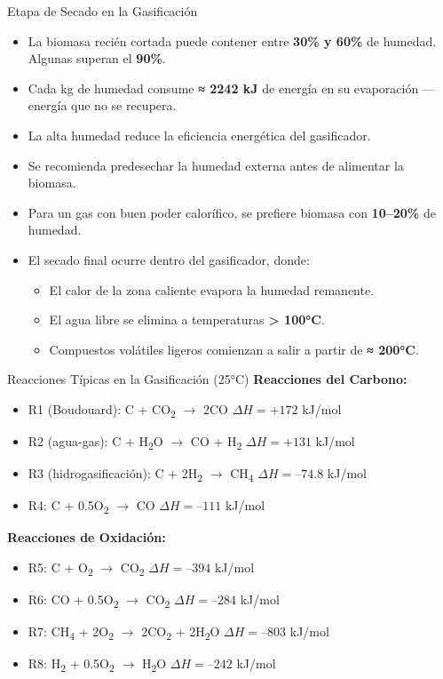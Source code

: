 \documentclass[../../main.tex]{subfiles}
\begin{document}
\begin{frame}{Etapa de Secado en la Gasificación}
\small
\begin{itemize}
  \item La biomasa recién cortada puede contener entre \textbf{30\% y 60\%} de humedad. Algunas superan el \textbf{90\%}.
  \item Cada kg de humedad consume \textbf{≈ 2242 kJ} de energía en su evaporación — energía que no se recupera.
  \item La alta humedad reduce la eficiencia energética del gasificador.
  \item Se recomienda predesechar la humedad externa antes de alimentar la biomasa.
  \item Para un gas con buen poder calorífico, se prefiere biomasa con \textbf{10–20\%} de humedad.
  \item El secado final ocurre dentro del gasificador, donde:
  \begin{itemize}
    \item El calor de la zona caliente evapora la humedad remanente.
    \item El agua libre se elimina a temperaturas \textbf{> 100°C}.
    \item Compuestos volátiles ligeros comienzan a salir a partir de \textbf{≈ 200°C}.
  \end{itemize}
\end{itemize}
\end{frame}

\begin{frame}{Reacciones Típicas en la Gasificación (25°C)}
\scriptsize
\textbf{Reacciones del Carbono:}
\begin{itemize}
  \item R1 (Boudouard): C + CO\textsubscript{2} $\rightarrow$ 2CO \hfill $\Delta H = +172$ kJ/mol
  \item R2 (agua-gas): C + H\textsubscript{2}O $\rightarrow$ CO + H\textsubscript{2} \hfill $\Delta H = +131$ kJ/mol
  \item R3 (hidrogasificación): C + 2H\textsubscript{2} $\rightarrow$ CH\textsubscript{4} \hfill $\Delta H = –74.8$ kJ/mol
  \item R4: C + 0.5O\textsubscript{2} $\rightarrow$ CO \hfill $\Delta H = –111$ kJ/mol
\end{itemize}

\vspace{0.5em}
\textbf{Reacciones de Oxidación:}
\begin{itemize}
  \item R5: C + O\textsubscript{2} $\rightarrow$ CO\textsubscript{2} \hfill $\Delta H = –394$ kJ/mol
  \item R6: CO + 0.5O\textsubscript{2} $\rightarrow$ CO\textsubscript{2} \hfill $\Delta H = –284$ kJ/mol
  \item R7: CH\textsubscript{4} + 2O\textsubscript{2} $\rightarrow$ 2CO\textsubscript{2} + 2H\textsubscript{2}O \hfill $\Delta H = –803$ kJ/mol
  \item R8: H\textsubscript{2} + 0.5O\textsubscript{2} $\rightarrow$ H\textsubscript{2}O \hfill $\Delta H = –242$ kJ/mol
\end{itemize}
\end{frame}
\end{document}
